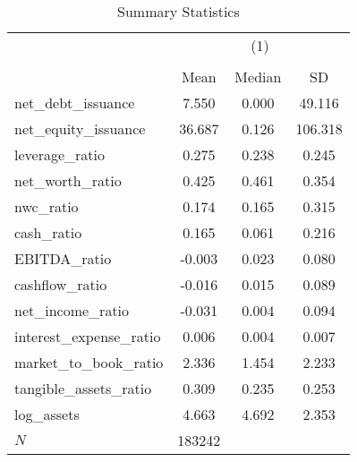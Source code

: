 \begin{table}[htbp]\centering
\def\sym#1{\ifmmode^{#1}\else\(^{#1}\)\fi}
\caption{Summary Statistics}
\begin{tabular}{l*{1}{ccc}}
\toprule
            &\multicolumn{3}{c}{(1)}               \\
            &\multicolumn{3}{c}{}                  \\
            &        Mean&      Median&          SD\\
\midrule
net\_debt\_issuance&       7.550&       0.000&      49.116\\
net\_equity\_issuance&      36.687&       0.126&     106.318\\
leverage\_ratio&       0.275&       0.238&       0.245\\
net\_worth\_ratio&       0.425&       0.461&       0.354\\
nwc\_ratio   &       0.174&       0.165&       0.315\\
cash\_ratio  &       0.165&       0.061&       0.216\\
EBITDA\_ratio&      -0.003&       0.023&       0.080\\
cashflow\_ratio&      -0.016&       0.015&       0.089\\
net\_income\_ratio&      -0.031&       0.004&       0.094\\
interest\_expense\_ratio&       0.006&       0.004&       0.007\\
market\_to\_book\_ratio&       2.336&       1.454&       2.233\\
tangible\_assets\_ratio&       0.309&       0.235&       0.253\\
log\_assets  &       4.663&       4.692&       2.353\\
\midrule
\(N\)       &      183242&            &            \\
\bottomrule
\end{tabular}
\end{table}
